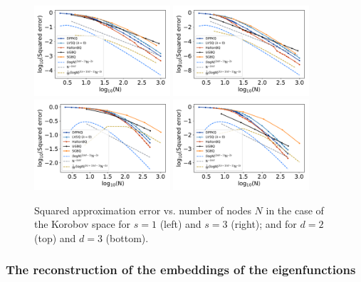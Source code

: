 \documentclass[twoside,11pt]{book}
\numberwithin{theorem}{chapter}
\numberwithin{definition}{chapter}
\numberwithin{proposition}{chapter}
\numberwithin{corollary}{chapter}
\numberwithin{example}{chapter}
\numberwithin{lemma}{chapter}
\numberwithin{assumption}{chapter}
\begin{document}
\begin{figure}
\centering
\includegraphics[width=0.45\textwidth]{img/neurips/multiSobolev/Sobolev_2D_ko_1_fig_2.pdf}
\includegraphics[width=0.45\textwidth]{img/neurips/multiSobolev/Sobolev_2D_ko_2_fig_2.pdf}\\
\includegraphics[width=0.45\textwidth]{img/neurips/multiSobolev/Sobolev_3D_ko_1_fig_2.pdf}
\includegraphics[width=0.45\textwidth]{img/neurips/multiSobolev/Sobolev_3D_ko_2_fig_2.pdf}
\caption{Squared approximation error vs. number of nodes $N$ in the case of the Korobov space for $s = 1$ (left) and $s=3$ (right); and for $d =2$ (top) and $d=3$ (bottom).
\label{fig:Korobov_DPPKQ_multialgo_results}}
\end{figure} 

\subsubsection{The reconstruction of the embeddings of the eigenfunctions}
\end{document}
